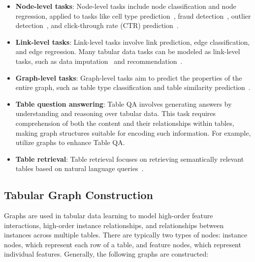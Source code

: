 \begin{itemize}[leftmargin=*]
    \item \textbf{Node-level tasks}: Node-level tasks include node classification and node regression, applied to tasks like cell type prediction~\citep{jin2023tabprompt}, fraud detection~\citep{rao2020xfraud, singh2023graphfc}, outlier detection~\citep{goodge2022lunar}, and click-through rate (CTR) prediction~\citep{li2019fi, du2022learning}.

    \item \textbf{Link-level tasks}: Link-level tasks involve link prediction, edge classification, and edge regression. Many tabular data tasks can be modeled as link-level tasks, such as data imputation~\citep{zhong2023data, you2020handling} and recommendation~\citep{robinson2024relbench}.

    \item \textbf{Graph-level tasks}: Graph-level tasks aim to predict the properties of the entire graph, such as table type classification and table similarity prediction~\citep{wang2021tuta, jia2023getpt, jin2023tabprompt}.

    \item \textbf{Table question answering}: Table QA involves generating answers by understanding and reasoning over tabular data. This task requires comprehension of both the content and their relationships within tables, making graph structures suitable for encoding such information. For example, \citet{zhang2020cfgnn, zhang2020graph} utilize graphs to enhance Table QA.

    \item \textbf{Table retrieval}: Table retrieval focuses on retrieving semantically relevant tables based on natural language queries~\citep{wang2021retrieving, cheng2021hitab}.
\end{itemize}

\subsection{Tabular Graph Construction}
Graphs are used in tabular data learning to model high-order feature interactions, high-order instance relationships, and relationships between instances across multiple tables. There are typically two types of nodes: instance nodes, which represent each row of a table, and feature nodes, which represent individual features. Generally, the following graphs are constructed:

